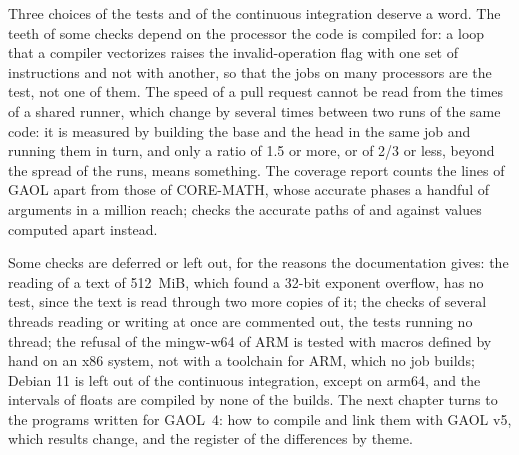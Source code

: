 \medskip
Three choices of the tests and of the continuous integration deserve a word. The teeth of some checks depend
on the processor the code is compiled for: a loop that a compiler
vectorizes raises the invalid-operation flag with one set of instructions
and not with another, so that the jobs on many processors are the test, not
one of them. The speed of a pull request cannot be read from the times of a
shared runner, which change by several times between two runs of the same
code: it is measured by building the base and the head in the same job and
running them in turn, and only a ratio of 1.5 or more, or of 2/3 or less, beyond the spread of
the runs, means something. The coverage report counts the lines of GAOL
apart from those of CORE-MATH, whose accurate phases a handful of arguments
in a million reach;  checks the accurate paths of 
and  against values computed apart instead.

\medskip
Some checks are deferred or left out, for the reasons the documentation
gives: the reading of a text of 512~MiB, which found a 32-bit exponent
overflow, has no test, since the text is read through two more copies of
it; the checks of several threads reading or writing at once are commented
out, the tests running no thread; the refusal of the mingw-w64 of ARM is tested with macros defined by
hand on an x86 system, not with a toolchain for ARM, which no job builds; Debian 11 is left out of the
continuous integration, except on arm64, and the intervals of floats are compiled by none of
the builds. The next chapter turns to the programs written for GAOL~4: how
to compile and link them with GAOL v5, which results change, and the
register of the differences by theme.
